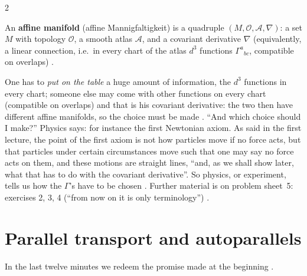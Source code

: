 \begin{paracol}{2}
\begin{definition}\label{def:cf-affine}
An \textbf{affine manifold} (affine Mannigfaltigkeit) is a quadruple $(M,\mathcal O,\mathcal A,\nabla)$: a set $M$ with topology
$\mathcal O$, a smooth atlas $\mathcal A$, and a covariant derivative $\nabla$ (equivalently, a linear connection, i.e.\ in
every chart of the atlas $d^3$ functions $\Gamma^a{}_{bc}$, compatible on overlaps) .
\end{definition}
One has to \emph{put on the table} a huge amount of information, the $d^3$ functions in every chart; someone else may come with
other functions on every chart (compatible on overlaps) and that is his covariant derivative: the two then have different affine
manifolds, so the choice must be made . ``And which choice should I make?'' Physics says: for instance the first
Newtonian axiom. As said in the first lecture, the point of the first axiom is not how particles move if no force acts, but that
particles under certain circumstances move such that one may say no force acts on them, and these motions are straight lines,
``and, as we shall show later, what that has to do with the covariant derivative''. So physics, or experiment, tells us how the
$\Gamma$'s have to be chosen .
Further material is on problem sheet~5: exercises 2, 3, 4 (``from now on it is only terminology'') .

\section{Parallel transport and autoparallels}\label{sec:cf-parallel}

In the last twelve minutes we redeem the promise made at the beginning .


\end{paracol}

